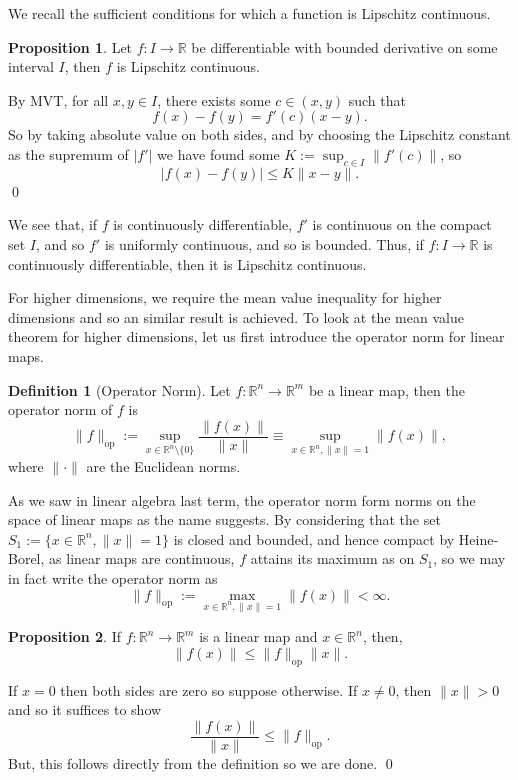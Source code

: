 \documentclass[
]{article}
\theoremstyle{definition}
\newtheorem{prop}{Proposition}
\theoremstyle{definition}
\newtheorem{definition}{Definition}[section]
\begin{document}
We recall the sufficient conditions for which a function is Lipschitz
continuous.

\begin{prop}
  Let \(f : I \to \mathbb{R}\) be differentiable with bounded derivative on some 
  interval \(I\), then \(f\) is Lipschitz continuous.
\end{prop}
\proof

By MVT, for all \(x, y \in I\), there exists some \(c \in (x, y)\) such
that \[f(x) - f(y) = f'(c) (x - y).\] So by taking absolute value on
both sides, and by choosing the Lipschitz constant as the supremum of
\(|f'|\) we have found some \(K := \sup_{c \in I} \|f'(c)\|\), so
\[|f(x) - f(y)| \le K \|x - y\|.\] \qed

We see that, if \(f\) is continuously differentiable, \(f'\) is
continuous on the compact set \(I\), and so \(f'\) is uniformly
continuous, and so is bounded. Thus, if \(f : I \to \mathbb{R}\) is
continuously differentiable, then it is Lipschitz continuous.

For higher dimensions, we require the mean value inequality for higher
dimensions and so an similar result is achieved. To look at the mean
value theorem for higher dimensions, let us first introduce the operator
norm for linear maps.

\begin{definition}[Operator Norm]
  Let \(f : \mathbb{R}^n \to \mathbb{R}^m\) be a linear map, then the operator 
  norm of \(f\) is 
  \[\| f\|_\text{op} := \sup_{x \in \mathbb{R}^n \setminus \{0\}} \frac{\| f(x) \|}{\|x\|}
  \equiv \sup_{x \in \mathbb{R}^n, \|x\| = 1} \|f(x)\|,\]
  where \(\| \cdot \|\) are the Euclidean norms.
\end{definition}

As we saw in linear algebra last term, the operator norm form norms on
the space of linear maps as the name suggests. By considering that the
set \(S_1 := \{x \in \mathbb{R}^n, \|x\| = 1\}\) is closed and bounded,
and hence compact by Heine-Borel, as linear maps are continuous, \(f\)
attains its maximum as on \(S_1\), so we may in fact write the operator
norm as
\[\| f\|_\text{op} := \max_{x \in \mathbb{R}^n, \|x\| = 1} \|f(x)\| < \infty.\]

\begin{prop}
  If \(f : \mathbb{R}^n \to \mathbb{R}^m\) is a linear map and \(x \in \mathbb{R}^n\),
  then, 
  \[\|f(x)\|  \le \|f\|_\text{op} \|x\|.\]
\end{prop}
\proof

If \(x = 0\) then both sides are zero so suppose otherwise. If
\(x \neq 0\), then \(\|x\| > 0\) and so it suffices to show
\[\frac{\|f(x)\|}{\|x\|} \le \|f\|_\text{op}.\] But, this follows
directly from the definition so we are done. \qed
\end{document}

